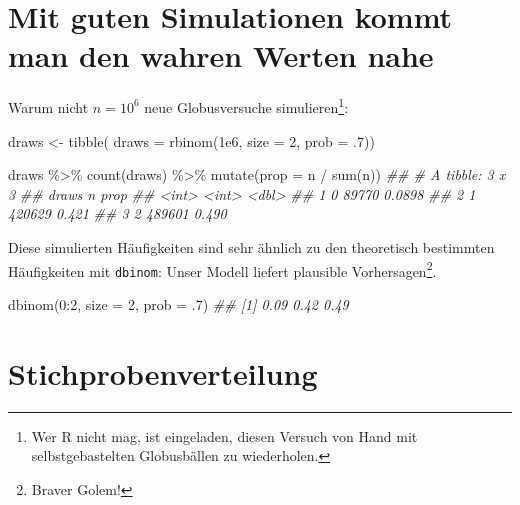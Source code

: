 \documentclass[
  a4paper,
  DIV=11]{scrreprt}
\newenvironment{Shaded}{\begin{snugshade}}{\end{snugshade}}
\newcommand{\AttributeTok}[1]{\textcolor[rgb]{0.40,0.45,0.13}{#1}}
\newcommand{\DecValTok}[1]{\textcolor[rgb]{0.68,0.00,0.00}{#1}}
\newcommand{\DocumentationTok}[1]{\textcolor[rgb]{0.37,0.37,0.37}{\textit{#1}}}
\newcommand{\FloatTok}[1]{\textcolor[rgb]{0.68,0.00,0.00}{#1}}
\newcommand{\FunctionTok}[1]{\textcolor[rgb]{0.28,0.35,0.67}{#1}}
\newcommand{\NormalTok}[1]{\textcolor[rgb]{0.00,0.23,0.31}{#1}}
\newcommand{\OtherTok}[1]{\textcolor[rgb]{0.00,0.23,0.31}{#1}}
\newcommand{\SpecialCharTok}[1]{\textcolor[rgb]{0.37,0.37,0.37}{#1}}
\theoremstyle{definition}
\theoremstyle{remark}
\begin{document}
\hypertarget{mit-guten-simulationen-kommt-man-den-wahren-werten-nahe}{%
\section{Mit guten Simulationen kommt man den wahren Werten
nahe}\label{mit-guten-simulationen-kommt-man-den-wahren-werten-nahe}}

Warum nicht \(n=10^6\) neue Globusversuche simulieren\footnote{Wer R
  nicht mag, ist eingeladen, diesen Versuch von Hand mit
  selbstgebastelten Globusbällen zu wiederholen.}:

\begin{Shaded}
\begin{Highlighting}[]
\NormalTok{draws }\OtherTok{\textless{}{-}} 
  \FunctionTok{tibble}\NormalTok{(}
    \AttributeTok{draws =} \FunctionTok{rbinom}\NormalTok{(}\FloatTok{1e6}\NormalTok{, }\AttributeTok{size =} \DecValTok{2}\NormalTok{, }\AttributeTok{prob =}\NormalTok{ .}\DecValTok{7}\NormalTok{))}

\NormalTok{draws }\SpecialCharTok{\%\textgreater{}\%} 
  \FunctionTok{count}\NormalTok{(draws) }\SpecialCharTok{\%\textgreater{}\%} 
  \FunctionTok{mutate}\NormalTok{(}\AttributeTok{prop =}\NormalTok{ n }\SpecialCharTok{/} \FunctionTok{sum}\NormalTok{(n))}
\DocumentationTok{\#\# \# A tibble: 3 x 3}
\DocumentationTok{\#\#   draws      n   prop}
\DocumentationTok{\#\#   \textless{}int\textgreater{}  \textless{}int\textgreater{}  \textless{}dbl\textgreater{}}
\DocumentationTok{\#\# 1     0  89770 0.0898}
\DocumentationTok{\#\# 2     1 420629 0.421 }
\DocumentationTok{\#\# 3     2 489601 0.490}
\end{Highlighting}
\end{Shaded}

Diese simulierten Häufigkeiten sind sehr ähnlich zu den theoretisch
bestimmten Häufigkeiten mit \texttt{dbinom}: Unser Modell liefert
plausible Vorhersagen\footnote{Braver Golem!}.

\begin{Shaded}
\begin{Highlighting}[]
\FunctionTok{dbinom}\NormalTok{(}\DecValTok{0}\SpecialCharTok{:}\DecValTok{2}\NormalTok{, }\AttributeTok{size =} \DecValTok{2}\NormalTok{, }\AttributeTok{prob =}\NormalTok{ .}\DecValTok{7}\NormalTok{)}
\DocumentationTok{\#\# [1] 0.09 0.42 0.49}
\end{Highlighting}
\end{Shaded}

\hypertarget{stichprobenverteilung}{%
\section{Stichprobenverteilung}\label{stichprobenverteilung}}
\end{document}

